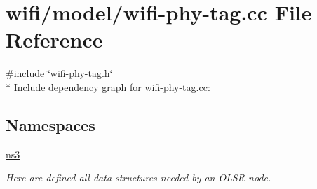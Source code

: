 \hypertarget{wifi-phy-tag_8cc}{}\section{wifi/model/wifi-\/phy-\/tag.cc File Reference}
\label{wifi-phy-tag_8cc}
{\ttfamily \#include \char`\"{}wifi-\/phy-\/tag.\+h\char`\"{}}\\*
Include dependency graph for wifi-\/phy-\/tag.cc\+:
\subsection*{Namespaces}
\begin{DoxyCompactItemize}
\item 
 \hyperlink{namespacens3}{ns3}
\begin{DoxyCompactList}\small\item\em Here are defined all data structures needed by an O\+L\+SR node. \end{DoxyCompactList}\end{DoxyCompactItemize}
